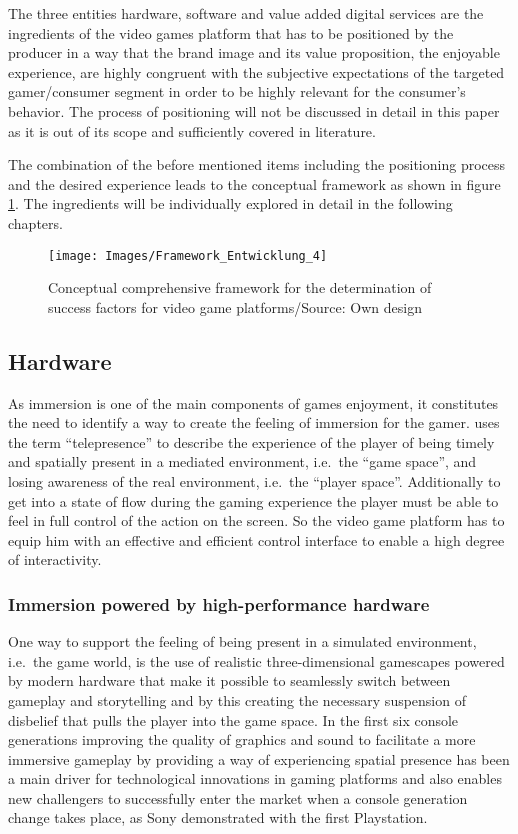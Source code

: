 \documentclass
[
    a4paper,
    11pt
]
{article}
\begin{document}
The three entities hardware, software and value added digital services
are the ingredients of the video games platform that has to be
positioned by the producer in a way that the brand image and its value
proposition, the enjoyable experience, are highly congruent with the
subjective expectations of the targeted gamer/consumer segment in order
to be highly relevant for the consumer's behavior. The process of
positioning will not be discussed in detail in this paper as it is out
of its scope and sufficiently covered in literature. \cite{Aaker1982} \cite{Feddersen2010}

The combination of the before mentioned items including the positioning
process and the desired experience leads to the conceptual framework as
shown in figure \ref{fig:framework}. The ingredients will be
individually explored in detail in the following chapters.
%
\begin{figure}[ht!]
    \texttt{[image: Images/Framework\_Entwicklung\_4]}
    \caption{Conceptual comprehensive framework for the determination of success factors for video game platforms/Source: Own design}
    \label{fig:framework}
\end{figure}
%
\subsection{Hardware}
\label{hardware}
%
As immersion is one of the main components of games enjoyment, it
constitutes the need to identify a way to create the feeling of
immersion for the gamer. \cite{Steuer1992} uses the term
``telepresence'' to describe the experience of the player of being
timely and spatially present in a mediated environment, i.e.~the ``game
space'', and losing awareness of the real environment, i.e.~the ``player
space''. Additionally to get into a state of flow during the gaming
experience the player must be able to feel in full control of the action
on the screen. \cite{Sweetser2005} So the video game platform has to
equip him with an effective and efficient control interface to enable a
high degree of interactivity. \cite{Skalski2011}
%
\subsubsection{Immersion powered by high-performance hardware}
\label{immersion-powered-by-high-performance-hardware-1p}
%
One way to support the feeling of being present in a simulated environment,
i.e.~the game world, is the use of realistic three-dimensional gamescapes powered by
modern hardware that make it possible to seamlessly switch between gameplay
and storytelling and by this creating the necessary suspension of disbelief
that pulls the player into the game space. \cite{Kuo2016} In the first six
console generations improving the quality of graphics and sound to facilitate a more immersive
gameplay by providing a way of experiencing spatial presence \cite{Weibel2011}
has been a main driver for technological innovations in gaming platforms and
also enables new challengers to successfully enter the market when a console generation change
takes place, as Sony demonstrated with the first Playstation.\cite{Gallagher2002}
\end{document}
